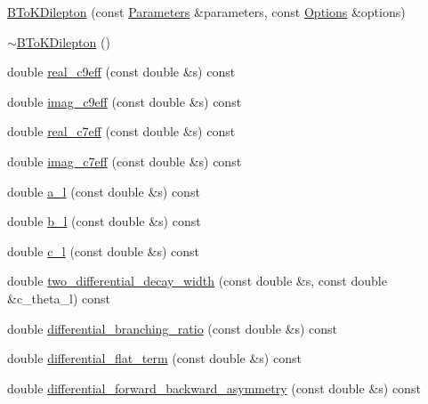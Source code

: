 \begin{DoxyCompactItemize}
\item 
\hyperlink{classeos_1_1BToKDilepton_3_01LowRecoil_01_4_ad711a9abe879818c986669eb151385ea}{BToKDilepton} (const \hyperlink{classeos_1_1Parameters}{Parameters} \&parameters, const \hyperlink{classeos_1_1Options}{Options} \&options)
\item 
\hyperlink{classeos_1_1BToKDilepton_3_01LowRecoil_01_4_a6402c66ad633e2660383fcb48b95ff80}{$\sim$BToKDilepton} ()
\item 
double \hyperlink{classeos_1_1BToKDilepton_3_01LowRecoil_01_4_a8acf4f28f1cb267049ebed550784e25e}{real\_\-c9eff} (const double \&s) const 
\item 
double \hyperlink{classeos_1_1BToKDilepton_3_01LowRecoil_01_4_a28bbb7fdde3f07f19b94983456f0b6d7}{imag\_\-c9eff} (const double \&s) const 
\item 
double \hyperlink{classeos_1_1BToKDilepton_3_01LowRecoil_01_4_af66edef64470949e6b38a2de1af2e5fb}{real\_\-c7eff} (const double \&s) const 
\item 
double \hyperlink{classeos_1_1BToKDilepton_3_01LowRecoil_01_4_ad8318f4a6c28e023fefe08ca671d7211}{imag\_\-c7eff} (const double \&s) const 
\item 
double \hyperlink{classeos_1_1BToKDilepton_3_01LowRecoil_01_4_a8ff826ff49870e2ccf119c2e9d88990b}{a\_\-l} (const double \&s) const 
\item 
double \hyperlink{classeos_1_1BToKDilepton_3_01LowRecoil_01_4_a1562f70f9d51d871d7bb7d05cb6e0158}{b\_\-l} (const double \&s) const 
\item 
double \hyperlink{classeos_1_1BToKDilepton_3_01LowRecoil_01_4_a09c11f0e15ce93470f54850bbe331745}{c\_\-l} (const double \&s) const 
\item 
double \hyperlink{classeos_1_1BToKDilepton_3_01LowRecoil_01_4_a2fd7d6d0e830e35f45f8d434a4b10059}{two\_\-differential\_\-decay\_\-width} (const double \&s, const double \&c\_\-theta\_\-l) const 
\item 
double \hyperlink{classeos_1_1BToKDilepton_3_01LowRecoil_01_4_a610b93d6e65a048705a5debd9d9fd912}{differential\_\-branching\_\-ratio} (const double \&s) const 
\item 
double \hyperlink{classeos_1_1BToKDilepton_3_01LowRecoil_01_4_a67f0c64f85102dc8ed5052eaa99573e1}{differential\_\-flat\_\-term} (const double \&s) const 
\item 
double \hyperlink{classeos_1_1BToKDilepton_3_01LowRecoil_01_4_a497df1a985ca9a80018557711f7b2ad3}{differential\_\-forward\_\-backward\_\-asymmetry} (const double \&s) const 

\end{DoxyCompactItemize}
